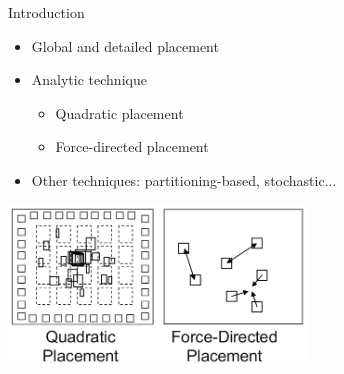\documentclass{beamer}
\begin{document}
\begin{frame}{Introduction}
\begin{itemize}
\item Global and detailed placement
\item Analytic technique
\begin{itemize}
\item Quadratic placement
\item Force-directed placement
\end{itemize}
\item Other techniques: partitioning-based, stochastic...
\end{itemize}

\centering
\includegraphics[width=0.6\textwidth]{images/placement.png}

\end{frame}
\end{document}
